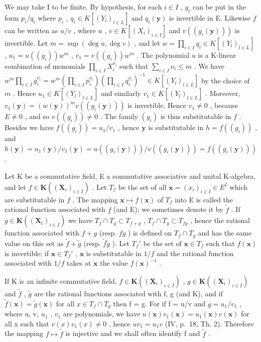 We may take I to be finite. By hypothesis, for each \(i \in I\) , \(g_i\) can be put in the form \(p_i/q_i\) where \(p_i\) , \(q_i \in K[(Y_l)_{l \in L}]\) and \(q_i(\mathbf{y})\) is invertible in E. Likewise \(f\) can be written as \(u/v\) , where \(u\) , \(v \in K[(X_i)_{i \in I}]\) and \(v((g_i(\mathbf{y})))\) is invertible. Let \(m = \sup(\deg u, \deg v)\) , and let \(w = \prod_{i \in I} q_i \in K[(Y_l)_{l \in L}]\) , \(u_1 = u((g_i))w^m\) , \(v_1 = v((g_i))w^m\) . The polynomial \(u\) is a K-linear combination of monomials \(\prod_{i \in I} X_i^{\nu_i}\) such that \(\sum_{i \in I} \nu_i \leqslant m\) . We have \(w^m \prod_{i \in I} g_i^{\nu_i} = w^m\left(\prod_{i \in I} p_i^{\nu_i}\right)\left(\prod_{i \in I} q_i^{\nu_i}\right)^{-1} \in K[(Y_l)_{l \in L}]\) by the choice of \(m\) . Hence \(u_1 \in K[(Y_l)_{l \in L}]\) and similarly \(v_1 \in K[(Y_l)_{l \in L}]\) . Moreover, \(v_1(\mathbf{y}) = (w(\mathbf{y}))^m v((g_i(\mathbf{y})))\) is invertible. Hence \(v_1 \neq 0\) , because \(E \neq 0\) , and so \(v((g_i)) \neq 0\) . The family \((g_i)\) is thus substitutable in \(f\) . Besides we have \(f((g_i)) = u_1/v_1\) , hence \(\mathbf{y}\) is substitutable in \(h = f((g_i))\) , and \(h(\mathbf{y}) = u_1(\mathbf{y})/v_1(\mathbf{y}) = u((g_i(\mathbf{y})))/v((g_i(\mathbf{y}))) = f((g_i(\mathbf{y})))\) .

Let K be a commutative field, E a commutative associative and unital K-algebra, and let \(f \in \mathbf{K}((\mathbf{X}_i)_{i \in I})\) . Let \(T_f\) be the set of all \(\mathbf{x} = (x_i)_{i \in I} \in E^{I}\) which are substitutable in \(f\) . The mapping \(\mathbf{x} \mapsto f(\mathbf{x})\) of \(T_f\) into E is called the rational function associated with \(f\) (and E); we sometimes denote it by \(\tilde{f}\) . If \(g \in \mathbf{K}((\mathbf{X}_i)_{i \in I})\) we have \(T_f \cap T_g \subset T_{f + g}\) , \(T_f \cap T_g \subset T_{fg}\) , hence the rational function associated with \(f + g\) (resp. \(fg\) ) is defined on \(T_f \cap T_g\) and has the same value on this set as \(\tilde{f} + \tilde{g}\) (resp. \(\tilde{f}\tilde{g}\) ). Let \(T_f'\) be the set of \(\mathbf{x} \in T_f\) such that \(f(\mathbf{x})\) is invertible; if \(\mathbf{x} \in T_f'\) , \(\mathbf{x}\) is substitutable in \(1/f\) and the rational function associated with \(1/f\) takes at \(\mathbf{x}\) the value \(f(\mathbf{x})^{-1}\) .

If K is an infinite commutative field, \(f \in \mathbf{K}((\mathbf{X}_i)_{i \in I})\) , \(g \in \mathbf{K}((\mathbf{X}_i)_{i \in I})\) and \(\tilde{f}\) , \(\tilde{g}\) are the rational functions associated with f, g (and K), and if \(\tilde{f}(\mathbf{x}) = \tilde{g}(\mathbf{x})\) for all \(x \in T_f \cap T_g\) then f = g. For if f = u/v and \(g = u_1 / v_1\) , where u, v, \(u_1\) , \(v_1\) are polynomials, we have \(u(\mathbf{x})v_1(\mathbf{x}) = u_1(\mathbf{x})v(\mathbf{x})\) for all x such that \(v(x)v_1(x) \neq 0\) , hence \(uv_1 = u_1v\) (IV, p.~18, Th. 2). Therefore the mapping \(f \mapsto \tilde{f}\) is injective and we shall often identify f and \(\tilde{f}\) .


